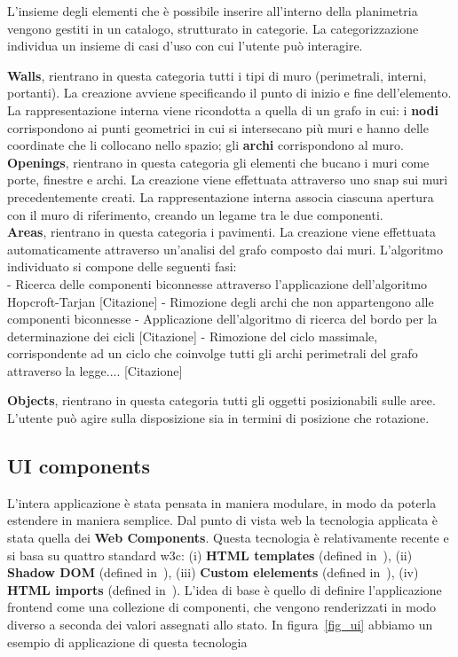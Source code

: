 L'insieme degli elementi che \`e possibile inserire all'interno della planimetria vengono gestiti in un catalogo, strutturato in categorie.
La categorizzazione individua un insieme di casi d'uso con cui l'utente pu\`o interagire.

\textbf{Walls}, rientrano in questa categoria tutti i tipi di muro (perimetrali, interni, portanti). La creazione avviene specificando il punto di inizio e fine dell'elemento. La rappresentazione interna viene ricondotta a quella di un grafo in cui: i \textbf{nodi} corrispondono ai punti geometrici in cui si intersecano pi\`u muri e hanno delle coordinate che li collocano nello spazio; gli \textbf{archi} corrispondono al muro.\\
\textbf{Openings}, rientrano in questa categoria gli elementi che bucano i muri come porte, finestre e archi. La creazione viene effettuata attraverso uno snap sui muri precedentemente creati. La rappresentazione interna associa ciascuna apertura con il muro di riferimento, creando un legame tra le due componenti.\\
\textbf{Areas}, rientrano in questa categoria i pavimenti. La creazione viene effettuata automaticamente attraverso un'analisi del grafo composto dai muri. L'algoritmo individuato si compone delle seguenti fasi:\\
    - Ricerca delle componenti biconnesse attraverso l'applicazione dell'algoritmo Hopcroft-Tarjan [Citazione]
    - Rimozione degli archi che non appartengono alle componenti biconnesse
    - Applicazione dell'algoritmo di ricerca del bordo per la determinazione dei cicli [Citazione]
    - Rimozione del ciclo massimale, corrispondente ad un ciclo che coinvolge tutti gli archi perimetrali del grafo attraverso la legge.... [Citazione]

\textbf{Objects}, rientrano in questa categoria tutti gli oggetti posizionabili sulle aree. L'utente pu\`o agire sulla disposizione sia in termini di posizione che rotazione.\\

\subsection{UI components}

L'intera applicazione \`e stata pensata in maniera modulare, in modo da poterla estendere in maniera semplice. Dal punto di vista web la tecnologia applicata \`e stata quella dei \textbf{Web Components}. Questa tecnologia \`e relativamente recente e si basa su quattro standard w3c: (i) \textbf{HTML templates} (defined in~\cite{Leithead:14:H}), (ii) \textbf{Shadow DOM} (defined in~\cite{9675597}), (iii) \textbf{Custom elelements} (defined in~\cite{6190251}), (iv) \textbf{HTML imports} (defined in~\cite{Glazkov:16:HI}). L'idea di base \`e quello di definire l'applicazione frontend come una collezione di componenti, che vengono renderizzati in modo diverso a seconda dei valori assegnati allo stato. In figura~\ref{fig_ui} abbiamo un esempio di applicazione di questa tecnologia \\

